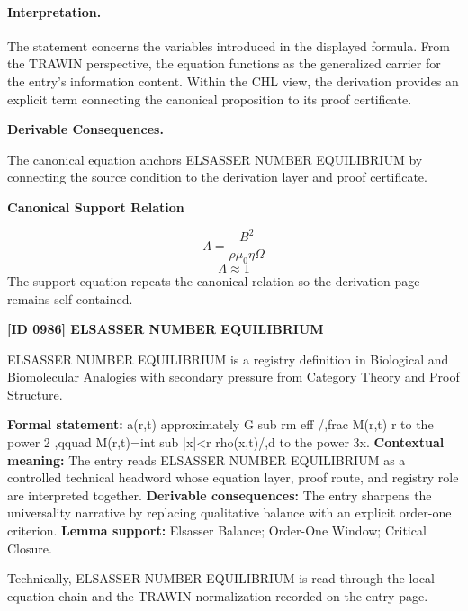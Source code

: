 \paragraph{Interpretation.}
The statement concerns the variables introduced in the displayed formula. From the TRAWIN perspective, the equation functions as the generalized carrier for the entry’s information content. Within the CHL view, the derivation provides an explicit term connecting the canonical proposition to its proof certificate.

\par\vspace{0.35em}
\noindent\textbf{Derivable Consequences.}\quad
\begingroup
\footnotesize
\raggedright
The canonical equation anchors ELSASSER NUMBER EQUILIBRIUM by connecting the source condition to the derivation layer and proof certificate.
\par\endgroup

\noindent\textbf{Canonical Support Relation}\par
\[
\Lambda=\frac{B^2}{\rho\mu_0\eta\Omega}
\]
\[
\Lambda\approx 1
\]
\noindent The support equation repeats the canonical relation so the derivation page remains self-contained.\par

\clearpage
\noindent\textbf{[ID 0986] ELSASSER NUMBER EQUILIBRIUM}\par
\vspace{0.35em}
\begingroup\small
{}
ELSASSER NUMBER EQUILIBRIUM is a registry definition in Biological and Biomolecular Analogies with secondary pressure from Category Theory and Proof Structure.

\begingroup\footnotesize\setlength{\emergencystretch}{3em}\sloppy
\textbf{Formal statement:} a(r,t) approximately G sub rm eff /,frac M(r,t) r to the power 2 ,qquad M(r,t)=int sub |x|<r rho(x,t)/,d to the power 3x. \textbf{Contextual meaning:} The entry reads ELSASSER NUMBER EQUILIBRIUM as a controlled technical headword whose equation layer, proof route, and registry role are interpreted together. \textbf{Derivable consequences:} The entry sharpens the universality narrative by replacing qualitative balance with an explicit order-one criterion. \textbf{Lemma support:} Elsasser Balance; Order-One Window; Critical Closure.\par
\endgroup

Technically, ELSASSER NUMBER EQUILIBRIUM is read through the local equation chain and the TRAWIN normalization recorded on the entry page.

